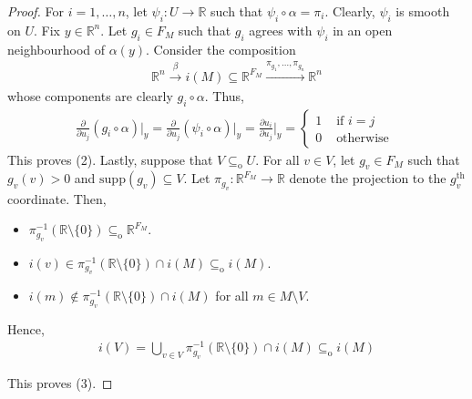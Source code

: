 \documentclass[10pt]{amsart}
\theoremstyle{definition}
\newtheorem{rem}[thm]{Remark}
\begin{document}
\begin{proof}
 For $i=1,\ldots ,n$, let $\psi _{i}:U \rightarrow \mathbb{R}  $ such that $\psi_i \circ \alpha =\pi _{i}$. Clearly, $\psi_{i}$ is smooth on $U$. Fix $y\in \mathbb{R} ^{n}$. Let $g_{i}\in F_{M}$ such that $g_{i}$ agrees with $\psi _{i}$ in an open neighbourhood of $\alpha (y)$. Consider the composition
 \begin{align*}
	 \mathbb{R} ^{n}\xrightarrow{\beta } i(M)\subseteq \mathbb{R} ^{F_{M}}\xrightarrow{\pi _{g_{1}},\ldots ,\pi _{g_{n}}} \mathbb{R} ^{n} 
 \end{align*}
 whose components are clearly $g_{i}\circ \alpha $. Thus,
 \begin{align*}
  \frac{\partial}{\partial u_{j}}(g_{i}\circ \alpha )\bigg\vert_{y}= \frac{\partial}{\partial u_{j}}(\psi _{i}\circ \alpha )\bigg\vert_{y} = \frac{\partial u_{i}}{\partial u_{j}}\bigg\vert_{y}=\begin{cases}
  	1 &\text{ if }i=j\\
	0 & \text{ otherwise } 
  \end{cases}
 \end{align*}
 This proves (2). Lastly, suppose that $V\subseteq_{\text{o} } U$. For all $v\in V$, let $g_{v}\in F_{M}$ such that $g_{v}(v)>0$ and $\text{supp}(g_{v})\subseteq V$. Let $\pi _{g_{v}}:\mathbb{R} ^{F_{M}} \rightarrow \mathbb{R}  $ denote the projection to the $g_{v}^{\text{th} }$ coordinate. Then, 
 \begin{itemize}
  \item $\pi _{g_{v}}^{-1}(\mathbb{R} \setminus \{ 0 \} )\subseteq_{\text{o} } \mathbb{R} ^{F_{M}}$.
 \item $i(v)\in \pi _{g_{v}}^{-1}(\mathbb{R} \setminus \{ 0 \} ) \cap i(M)\subseteq _{\text{o} } i(M)$.
 \item $i(m)\notin \pi _{g_{v}}^{-1}(\mathbb{R} \setminus \{ 0 \} )\cap i(M)$ for all $m\in M\setminus V$.
 \end{itemize}
Hence, 
\begin{align*}
 i(V)=\bigcup\limits_{v\in V} \pi ^{-1}_{g_{v}} (\mathbb{R} \setminus \{ 0 \} )\cap i(M) \subseteq _{\text{o} } i(M) 
\end{align*}

This proves (3).
\end{proof}
\end{document}
